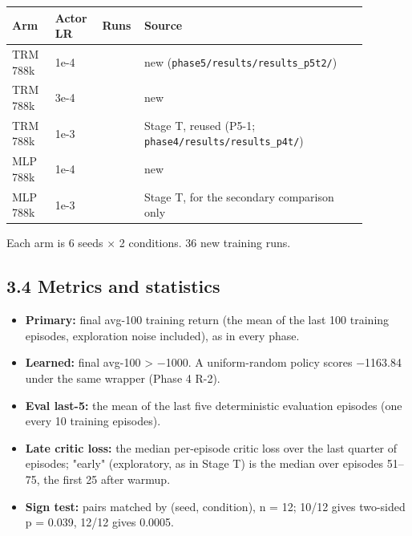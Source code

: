 \documentclass[11pt]{article}
\begin{document}
\begin{center}\small\begin{tabular}{>{\raggedright\arraybackslash}p{0.118\linewidth}>{\raggedright\arraybackslash}p{0.118\linewidth}>{\raggedleft\arraybackslash}p{0.063\linewidth}>{\raggedright\arraybackslash}p{0.578\linewidth}}
\toprule
Arm & Actor LR & Runs & Source \\
\midrule
TRM 788k & 1e-4 & 12 & new (\texttt{phase5/\allowbreak{}results/\allowbreak{}results\_\allowbreak{}p5t2/\allowbreak{}}) \\
TRM 788k & 3e-4 & 12 & new \\
TRM 788k & 1e-3 & 12 & Stage T, reused (P5-1; \texttt{phase4/\allowbreak{}results/\allowbreak{}results\_\allowbreak{}p4t/\allowbreak{}}) \\
MLP 788k & 1e-4 & 12 & new \\
MLP 788k & 1e-3 & 12 & Stage T, for the secondary comparison only \\
\bottomrule
\end{tabular}\end{center}



Each arm is 6 seeds $\times$ 2 conditions. 36 new training runs.



\subsection*{3.4 Metrics and statistics}



\begin{itemize}
\item \textbf{Primary:} final avg-100 training return (the mean of the last 100 training episodes, exploration noise included), as in every phase.
\item \textbf{Learned:} final avg-100 > $-$1000. A uniform-random policy scores $-$1163.84 under the same wrapper (Phase 4 R-2).
\item \textbf{Eval last-5:} the mean of the last five deterministic evaluation episodes (one every 10 training episodes).
\item \textbf{Late critic loss:} the median per-episode critic loss over the last quarter of episodes; "early" (exploratory, as in Stage T) is the median over episodes 51--75, the first 25 after warmup.
\item \textbf{Sign test:} pairs matched by (seed, condition), n = 12; 10/12 gives two-sided p = 0.039, 12/12 gives 0.0005.
\end{itemize}
\end{document}
